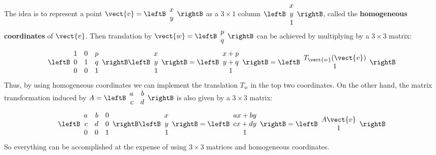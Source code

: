 The idea is to represent a point $\vect{v} = \leftB
\begin{array}{r}
x\\
y
\end{array}
\rightB$
 as a $3 \times 1$ column $\leftB
 \begin{array}{r}
 x\\
 y\\
 1
 \end{array}
 \rightB$, called the \textbf{homogeneous coordinates} of $\vect{v}$. Then translation by $\vect{w} = \leftB
 \begin{array}{r}
 p\\
 q
 \end{array}
 \rightB$ can be achieved by multiplying by a $3 \times 3$ matrix:
\begin{equation*}
\leftB
\begin{array}{rrr}
1 & 0 & p\\
0 & 1 & q\\
0 & 0 & 1
\end{array}
\rightB \leftB
\begin{array}{r}
x\\
y\\
1
\end{array}
\rightB
=
\leftB
\begin{array}{c}
x + p\\
y + q\\
1
\end{array}
\rightB
=
\leftB
\begin{array}{c}
T_{\vect{w}}(\vect{v})\\
1
\end{array}
\rightB
\end{equation*}
Thus, by using homogeneous coordinates we can implement the translation $T_{w}$ in the top two coordinates. On the other hand, the matrix transformation induced by $A = \leftB
\begin{array}{rr}
a & b\\
c & d
\end{array}
\rightB$ is also given by a $3 \times 3$ matrix:
\begin{equation*}
\leftB
\begin{array}{rrr}
a & b & 0\\
c & d & 0\\
0 & 0 & 1
\end{array}
\rightB \leftB
\begin{array}{r}
x\\
y\\
1
\end{array}
\rightB
=
\leftB
\begin{array}{c}
ax + by\\
cx + dy\\
1
\end{array}
\rightB
=
\leftB
\begin{array}{c}
A\vect{v}\\
1
\end{array}
\rightB
\end{equation*}
So everything can be accomplished at the expense of using $3 \times 3$ matrices and homogeneous coordinates.


